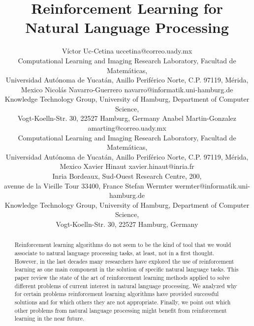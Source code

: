 \documentclass[jair,twoside,11pt,theapa]{article}
\begin{document}
\title{Reinforcement Learning for Natural Language Processing}

\author{\name V\'ictor Uc-Cetina \email uccetina@correo.uady.mx \\
       \addr Computational Learning and Imaging Research Laboratory, Facultad de Matem\'aticas, \\
       Universidad Aut\'onoma de Yucat\'an, Anillo Perif\'erico Norte, C.P. 97119, M\'erida, Mexico
       \AND
       \name Nicol\'as Navarro-Guerrero \email navarro@informatik.uni-hamburg.de \\
       \addr Knowledge Technology Group, University of Hamburg, Department of Computer Science,\\ 
       Vogt-Koelln-Str. 30, 22527 Hamburg, Germany
       \AND
       \name Anabel Martin-Gonzalez \email amarting@correo.uady.mx \\
       \addr Computational Learning and Imaging Research Laboratory, Facultad de Matem\'aticas, \\
       Universidad Aut\'onoma de Yucat\'an, Anillo Perif\'erico Norte, C.P. 97119, M\'erida, Mexico
       \AND
       \name Xavier Hinaut \email xavier.hinaut@inria.fr \\
       \addr Inria Bordeaux, Sud-Ouest Research Centre, 200, \\
       avenue de la Vieille Tour 33400, France
       \AND
       \name Stefan Wermter \email wermter@informatik.uni-hamburg.de \\
       \addr Knowledge Technology Group, University of Hamburg, Department of Computer Science,\\ 
       Vogt-Koelln-Str. 30, 22527 Hamburg, Germany}


\maketitle


\begin{abstract}
Reinforcement learning algorithms do not seem to be the kind of tool that we would associate to natural language 
processing tasks, at least, not in a first thought. However, in the last decades many researchers have
explored the use of reinforcement learning as one main component in the solution of specific natural language tasks. 
This paper review the state of the art of reinforcement learning methods applied
to solve different problems of current interest in natural language processing.
We analyzed why for certain problems reinforcement learning algorithms have provided
successful solutions and for which others they are not appropriate. Finally, we point out which other problems  
from natural language processing might benefit from reinforcement learning in the near future.
\end{abstract}
\end{document}
